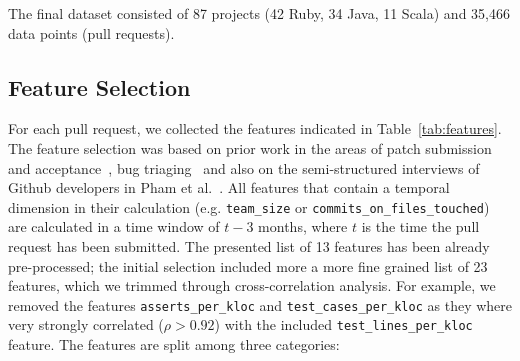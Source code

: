 \documentclass{sig-alternate}
\begin{document}
The final dataset consisted of 87 projects (42 Ruby, 34 Java, 11 Scala)
and 35,466 data points (pull requests).

\subsection{Feature Selection}

For each pull request, we collected the features indicated in
Table~\ref{tab:features}.  The feature selection was based on prior work in the
areas of patch submission and
acceptance~\cite{Nagap05,Bird07a,Weiss08,Jeong09}, bug triaging~\cite{} and
also on the semi-structured interviews of Github developers in Pham et
al.~\cite{Pham13}. All features that contain a temporal dimension in their
calculation (e.g.  \texttt{team\_size} or \texttt{commits\_on\_files\_touched})
are calculated in a time window of $t - 3$ months, where $t$ is the time the
pull request has been submitted.  The presented list of 13 features has been
already pre-processed; the initial selection included more a more fine grained
list of 23 features, which we trimmed through cross-correlation analysis. For
example, we removed the features \texttt{asserts\_per\_kloc} and
\texttt{test\_cases\_per\_kloc} as they where very strongly correlated ($\rho >
0.92$) with the included \texttt{test\_lines\_per\_kloc} feature.  The features
are split among three categories:
\end{document}
